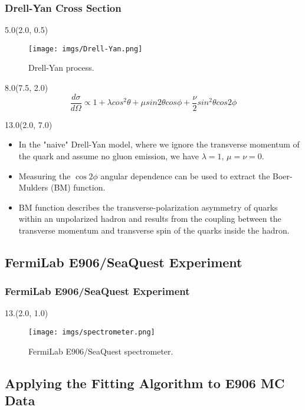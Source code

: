 \documentclass[12pt, xcolor={dvipsnames}, aspectratio = 169, sans,mathserif]{beamer}
\newenvironment{List}[2]
{\begin{textblock}{#1}#2
\begin{itemize}}
{\end{itemize}
\end{textblock}}
\newenvironment{Pic}[2]
{\begin{textblock}{#1}#2
\begin{figure}}
{\end{figure}
\end{textblock}}
\begin{document}
\begin{frame}
\frametitle{Drell-Yan Cross Section}

\begin{Pic}{5.0}{(2.0, 0.5)}
\texttt{[image: imgs/Drell-Yan.png]}
\caption{Drell-Yan process.}
\end{Pic}

\begin{textblock}{8.0}(7.5, 2.0)
\begin{equation*}
\frac{d\sigma}{d\Omega} \propto 1 + \lambda cos^{2}\theta + \mu sin2\theta cos\phi + \frac{\nu}{2} sin^{2}\theta cos2\phi
\end{equation*}
\end{textblock}

\begin{List}{13.0}{(2.0, 7.0)}

  \item In the "naive" Drell-Yan model, where we ignore the transverse momentum of the quark and assume no gluon emission,
  we have $\lambda = 1$, $\mu = \nu = 0$.

  \item Measuring the $\cos 2\phi$ angular dependence can be used to extract the Boer-Mulders (BM) function.

  \item BM function describes the transverse-polarization asymmetry of quarks within an unpolarized hadron and results
  from the coupling between the transverse momentum and transverse spin of the quarks inside the hadron.

\end{List}

\end{frame}


\subsection{FermiLab E906/SeaQuest Experiment}

\begin{frame}
\frametitle{FermiLab E906/SeaQuest Experiment}

\begin{Pic}{13.}{(2.0, 1.0)}
\texttt{[image: imgs/spectrometer.png]}
\caption{FermiLab E906/SeaQuest spectrometer.}
\end{Pic}

\end{frame}

\subsection{Applying the Fitting Algorithm to E906 MC Data}
\end{document}

